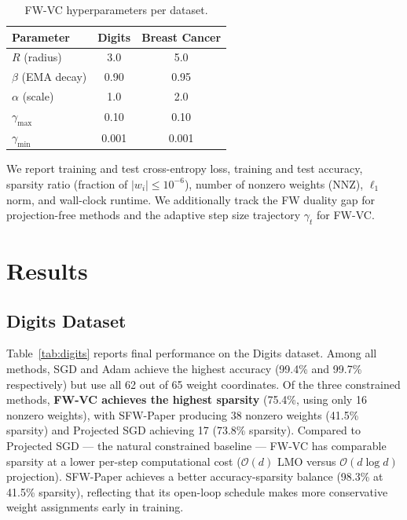 \documentclass[10pt,twocolumn]{article}
\begin{document}
\begin{table}[h]
\centering
\caption{FW-VC hyperparameters per dataset.}
\label{tab:hparams}
\small
\begin{tabular}{lcc}
\toprule
Parameter & Digits & Breast Cancer \\
\midrule
$R$ (radius) & 3.0 & 5.0 \\
$\beta$ (EMA decay) & 0.90 & 0.95 \\
$\alpha$ (scale) & 1.0 & 2.0 \\
$\gamma_{\max}$ & 0.10 & 0.10 \\
$\gamma_{\min}$ & 0.001 & 0.001 \\
\bottomrule
\end{tabular}
\end{table}

We report training and test cross-entropy loss, training and test
accuracy, sparsity ratio (fraction of $|w_i| \leq 10^{-6}$), number
of nonzero weights (NNZ), $\ell_1$ norm, and wall-clock runtime.
We additionally track the FW duality gap for projection-free methods
and the adaptive step size trajectory $\gamma_t$ for FW-VC.


\section{Results}
\label{sec:results}

\subsection{Digits Dataset}

Table~\ref{tab:digits} reports final performance on the Digits dataset.
Among all methods, SGD and Adam achieve the highest accuracy (99.4\%
and 99.7\% respectively) but use all 62 out of 65 weight coordinates.
Of the three constrained methods, \textbf{FW-VC achieves the highest
sparsity} (75.4\%, using only 16 nonzero weights), with SFW-Paper
producing 38 nonzero weights (41.5\% sparsity) and Projected SGD
achieving 17 (73.8\% sparsity). Compared to Projected SGD — the
natural constrained baseline — FW-VC has comparable sparsity at
a lower per-step computational cost ($\mathcal{O}(d)$ LMO versus
$\mathcal{O}(d\log d)$ projection). SFW-Paper achieves a better
accuracy-sparsity balance (98.3\% at 41.5\% sparsity), reflecting
that its open-loop schedule makes more conservative weight assignments
early in training.
\end{document}

